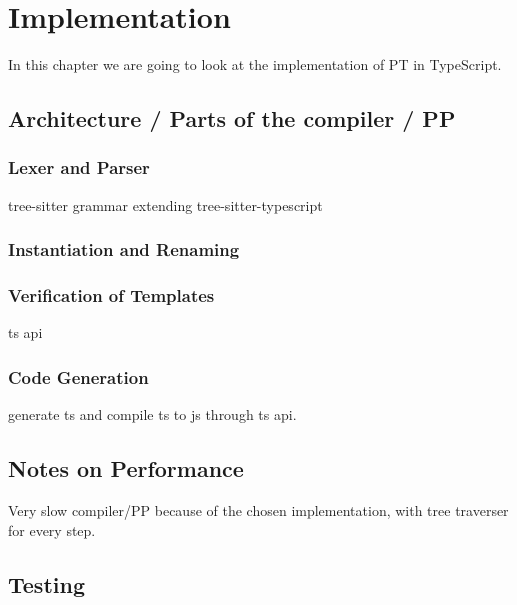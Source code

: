
\chapter{Implementation}\label{ch:implementation}

In this chapter we are going to look at the implementation of PT in TypeScript.

\section{Architecture / Parts of the compiler / PP}\label{sec:architecture}



\subsection{Lexer and Parser}\label{subsec:lexer-and-parser}

tree-sitter grammar extending tree-sitter-typescript

\subsection{Instantiation and Renaming}\label{subsec:instantiation-and-renaming}


\subsection{Verification of Templates}\label{subsec:verification-of-templates}

ts api

\subsection{Code Generation}\label{subsec:code-generation}

generate ts and compile ts to js through ts api.

\section{Notes on Performance}\label{sec:notes-on-performance}

Very slow compiler/PP because of the chosen implementation, with tree traverser for every step.


\section{Testing}\label{sec:testing}

